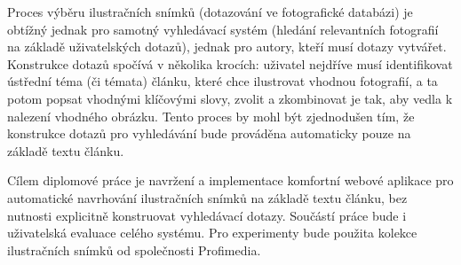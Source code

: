 Proces výběru ilustračních snímků (dotazování ve fotografické databázi) je obtížný jednak pro samotný vyhledávací systém (hledání relevantních fotografií na základě uživatelských dotazů), jednak pro autory, kteří musí dotazy vytvářet. Konstrukce dotazů spočívá v několika krocích: uživatel nejdříve musí identifikovat ústřední téma (či témata) článku, které chce ilustrovat vhodnou fotografií, a ta potom popsat vhodnými klíčovými slovy, zvolit a zkombinovat je tak, aby vedla k nalezení vhodného obrázku. Tento proces by mohl být zjednodušen tím, že konstrukce dotazů pro vyhledávání bude prováděna automaticky pouze na základě textu článku. 

Cílem diplomové práce je navržení a implementace komfortní webové aplikace pro automatické navrhování ilustračních snímků na základě textu článku, bez nutnosti explicitně konstruovat vyhledávací dotazy. Součástí práce bude i uživatelská evaluace celého systému. Pro experimenty bude použita kolekce ilustračních snímků od společnosti Profimedia.

